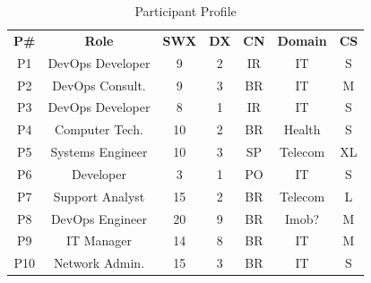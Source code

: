 \begin{table}[t]
\centering
\caption{Participant Profile}
\label{participant_table}
\begin{tabular}{ccccccc}
\textbf{P\#}          & \textbf{Role}         & \textbf{SWX} & \textbf{DX} & \textbf{CN}   & \textbf{Domain}    & \multicolumn{1}{l}{\textbf{CS}} \\
P1                   & DevOps Developer      & 9            & 2           & IR            & IT                 & S                               \\

P2                   & DevOps Consult.       & 9            & 3           & BR            & IT                 & M                               \\

P3                   & DevOps Developer      & 8            & 1           & IR            & IT                 & S                               \\

P4                   & Computer Tech.        & 10           & 2           & BR            & Health             & S                               \\

P5                   & Systems Engineer      & 10           & 3           & SP            & Telecom            & XL                              \\

P6                   & Developer             & 3            & 1           & PO            & IT                 & S                               \\

P7                   & Support Analyst       & 15           & 2           & BR            & Telecom            & L                               \\

P8                   & DevOps Engineer       & 20           & 9           & BR            & Imob?              & M                               \\

P9                   & IT Manager            & 14           & 8           & BR            & IT                 & M                               \\

P10                  & Network Admin.        & 15           & 3           & BR            & IT                 & S                               \\


\end{tabular}
\end{table}

